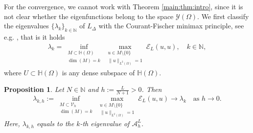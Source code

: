 \documentclass[10 pt]{article}
\newtheorem{proposition}[theorem]{Proposition}
\numberwithin{equation}{section}
\def\N{\mathbb{N}}
\def\mH{\mathbb{H}}
\begin{document}
For the convergence, we cannot work with Theorem \ref{main:thm:intro}, since it is not clear whether the eigenfunctions belong to the space $\mathcal{Y} (\Omega)$. We first classify the eigenvalues $\{\lambda_k\}_{k\in \N}$ of $L_{\Delta}$ with the Courant-Fischer minimax principle, see e.g. \cite[Proposition 2.3 and Remark 2.4]{GJW22}, that is it holds
\begin{align}\label{CF}
\lambda_k=\inf_{\substack{M\subset \mH(\Omega)\\ \dim(M)=k}} \max_{\substack{u\in M\setminus\{0\}\\ \|u\|_{L^2(\Omega)}=1}} \mathcal{E}_L(u,u),\quad k\in \N, 
\end{align}
where $U\subset\mH(\Omega)$ is any dense subspace of $\mH(\Omega)$.

\begin{proposition}\label{prop:eigen-approx}
Let $N\in \mathbb N$ and $h:=\frac{L}{N+1}>0$. Then
$$
\lambda_{k,h}:=\inf_{\substack{M\subset \mathcal{V}_{h}\\ \dim(M)=k}} \max_{\substack{u\in M\setminus\{0\}\\ \|u\|_{L^2(\Omega)}=1}} \mathcal{E}_L(u,u)\to \lambda_k\quad\text{as $h\to 0$.}
$$
Here, $\lambda_{k,h}$ equals to the $k$-th eigenvalue of $\mathcal{A}^L_{h}$.
\end{proposition}
\end{document}
